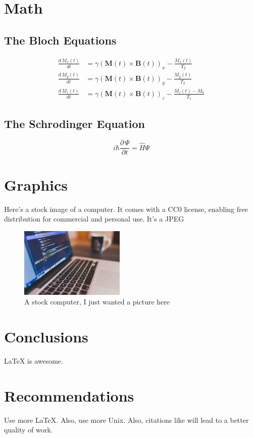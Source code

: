 \documentclass{workreport}
\begin{document}
\begin{body}
\section{Math}

\lipsum[1]

\subsection{The Bloch Equations}

	\begin{align}
		\frac{d\, M_x(t)}{dt} &= \gamma(\mathbf{M}(t) \times \mathbf{B}(t))_x - \frac{M_x(t)}{T_2} \\
		\frac{d\, M_y(t)}{dt} &= \gamma(\mathbf{M}(t) \times \mathbf{B}(t))_y - \frac{M_y(t)}{T_2} \\
		\frac{d\, M_z(t)}{dt} &= \gamma(\mathbf{M}(t) \times \mathbf{B}(t))_z - \frac{M_z(t) - M_0}{T_1}
	\end{align}

\subsection{The Schrodinger Equation}

	\begin{equation}
		i\hbar \frac{\partial \, \Psi}{\partial t} = \hat{H}\Psi
	\end{equation}

\section{Graphics}
    Here's a stock image of a computer. It comes with a CC0 license, enabling
    free distribution for commercial and personal use. It's a JPEG

    \begin{figure}[!ht]
    	\centering
        \label{fig:stock_computer}
        \includegraphics[width=5cm]{./stock-image.jpg}
        \caption{A stock computer, I just wanted a picture here}
    \end{figure}

\section{Conclusions}
	\gls{LaTeX} is awesome.

\section{Recommendations}

	Use more \LaTeX. Also, use more \gls{Unix}. Also, citations like
    \cite{schweiger_principles_2001} will lead to a better quality of work.

\end{body}

\begin{backmatter}

		\lipsum[1-2]

		\lipsum[1-2]

\end{backmatter}
\end{document}
